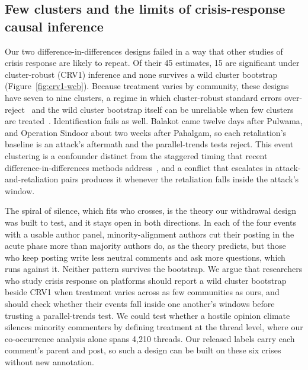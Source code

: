 \subsection{Few clusters and the limits of crisis-response causal inference}

Our two difference-in-differences designs failed in a way that other studies of crisis response are likely to repeat. Of their 45 estimates, 15 are significant under cluster-robust (CRV1) inference and none survives a wild cluster bootstrap (Figure~\ref{fig:crv1-wcb}). Because treatment varies by community, these designs have seven to nine clusters, a regime in which cluster-robust standard errors over-reject~\cite{cameron2008bootstrap} and the wild cluster bootstrap itself can be unreliable when few clusters are treated~\cite{mackinnon2017wildbootstrap}. Identification fails as well. Balakot came twelve days after Pulwama, and Operation Sindoor about two weeks after Pahalgam, so each retaliation's baseline is an attack's aftermath and the parallel-trends tests reject. This event clustering is a confounder distinct from the staggered timing that recent difference-in-differences methods address~\cite{goodmanbacon2021did}, and a conflict that escalates in attack-and-retaliation pairs produces it whenever the retaliation falls inside the attack's window.

The spiral of silence, which fits who crosses, is the theory our withdrawal design was built to test, and it stays open in both directions. In each of the four events with a usable author panel, minority-alignment authors cut their posting in the acute phase more than majority authors do, as the theory predicts, but those who keep posting write less neutral comments and ask more questions, which runs against it. Neither pattern survives the bootstrap. We argue that researchers who study crisis response on platforms should report a wild cluster bootstrap beside CRV1 when treatment varies across as few communities as ours, and should check whether their events fall inside one another's windows before trusting a parallel-trends test. We could test whether a hostile opinion climate silences minority commenters by defining treatment at the thread level, where our co-occurrence analysis alone spans 4,210 threads. Our released labels carry each comment's parent and post, so such a design can be built on these six crises without new annotation.